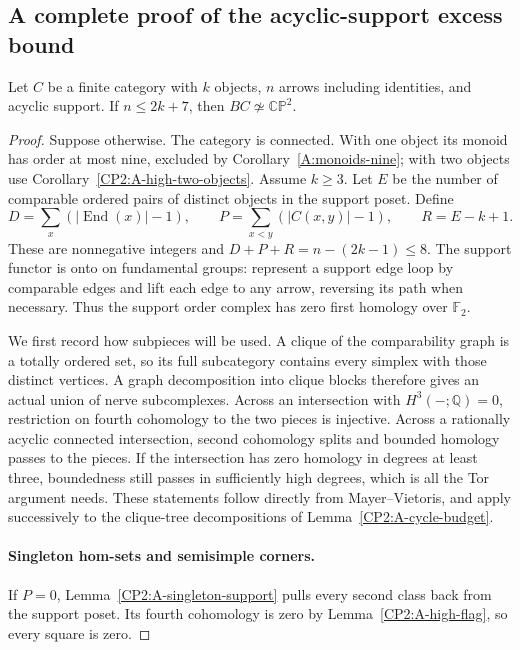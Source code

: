 \subsection{A complete proof of the acyclic-support excess bound}

\begin{theorem}
\label{CP2:A-high-acyclic-eight}
Let $C$ be a finite category with $k$ objects, $n$ arrows including
identities, and acyclic support.  If $n\leq2k+7$, then
$BC\not\simeq\mathbb{CP}^2$.
\end{theorem}
\begin{proof}
Suppose otherwise.  The category is connected.  With one object
its monoid has order at most nine, excluded by
Corollary~\ref{A:monoids-nine}; with two objects use
Corollary~\ref{CP2:A-high-two-objects}.  Assume $k\geq3$.
Let $E$ be the number of comparable ordered pairs of distinct
objects in the support poset.  Define
\[
 D=\sum_x(|\operatorname{End}(x)|-1),\qquad
 P=\sum_{x<y}(|C(x,y)|-1),\qquad R=E-k+1.
\]
These are nonnegative integers and
$D+P+R=n-(2k-1)\leq8$.  The support functor is onto on
fundamental groups: represent a support edge loop by
comparable edges and lift each edge to any arrow, reversing
its path when necessary.  Thus the support order complex
has zero first homology over $\mathbb F_2$.

We first record how subpieces will be used.  A clique of the
comparability graph is a totally ordered set, so its full
subcategory contains every simplex with those distinct
vertices.  A graph decomposition into clique blocks therefore
gives an actual union of nerve subcomplexes.  Across an
intersection with $H^3(-;\mathbb Q)=0$, restriction on fourth
cohomology to the two pieces is injective.  Across a rationally
acyclic connected intersection, second cohomology splits and
bounded homology passes to the pieces.  If the intersection
has zero homology in degrees at least three, boundedness
still passes in sufficiently high degrees, which is all the
Tor argument needs.  These statements follow directly from
Mayer--Vietoris, and apply successively to the clique-tree
decompositions of Lemma~\ref{CP2:A-cycle-budget}.

\paragraph{Singleton hom-sets and semisimple corners.}
If $P=0$, Lemma~\ref{CP2:A-singleton-support} pulls every
second class back from the support poset.  Its fourth
cohomology is zero by Lemma~\ref{CP2:A-high-flag}, so every
square is zero.


\end{proof}
